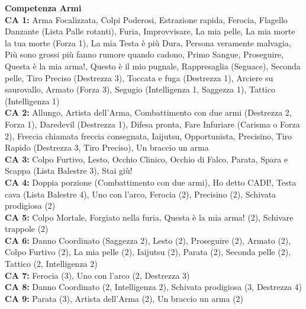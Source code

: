	\begin{multicols}{2}
	\small

\textbf{{\large Competenza Armi}}\\

	\textbf{CA 1:} Arma Focalizzata, Colpi Poderosi, Estrazione rapida, Ferocia, Flagello Danzante (Lista Palle rotanti), Furia, Improvvisare, La mia pelle, La mia morte la tua morte (Forza 1), La mia Testa è più Dura, Persona veramente malvagia, Più sono grossi più fanno rumore quando cadono, Primo Sangue, Proseguire, Questa è la mia arma!, Questo è il mio pugnale, Rappresaglia (Seguace), Seconda pelle, Tiro Preciso (Destrezza 3), Toccata e fuga (Destrezza 1), Arciere su saurovallo, Armato (Forza 3), Segugio (Intelligenza 1, Saggezza 1), Tattico (Intelligenza 1)\\

	\textbf{CA 2:} Allungo, Artista dell'Arma, Combattimento con due armi (Destrezza 2, Forza 1), Daredevil (Destrezza 1), Difesa pronta, Fare Infuriare (Carisma o Forza 2), Freccia chiamata freccia consegnata, Iaijutsu, Opportunista, Precisino, Tiro Rapido (Destrezza 3, Tiro Preciso), Un braccio un arma\\

	\textbf{CA 3:} Colpo Furtivo, Lesto, Occhio Clinico, Occhio di Falco, Parata, Spara e Scappa (Lista Balestre 3), Stai giù!\\

	\textbf{CA 4:} Doppia porzione (Combattimento con due armi), Ho detto CADI!, Testa cava (Lista Balestre 4), Uno con l'arco, Ferocia (2), Precisino (2), Schivata prodigiosa (2)\\

	\textbf{CA 5:} Colpo Mortale, Forgiato nella furia, Questa è la mia arma! (2), Schivare trappole (2)\\

	\textbf{CA 6:} Danno Coordinato (Saggezza 2), Lesto (2), Proseguire (2), Armato (2), Colpo Furtivo (2), La mia pelle (2), Iaijutsu (2), Parata (2), Seconda pelle (2), Tattico (2, Intelligenza 2)\\

	\textbf{CA 7:} Ferocia (3), Uno con l'arco (2, Destrezza 3)\\

	\textbf{CA 8:} Danno Coordinato (2, Intelligenza 2), Schivata prodigiosa (3, Destrezza 4)\\

	\textbf{CA 9:} Parata (3), Artista dell'Arma (2), Un braccio un arma (2)\\


\end{multicols}
